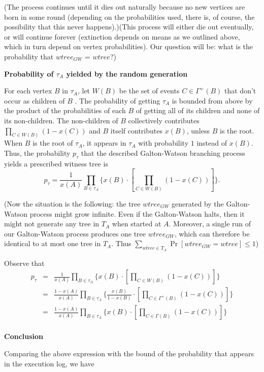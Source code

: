 \documentclass[twoside]{article}
\begin{document}
(The process continues until it dies out naturally because no new vertices are born in some round (depending on the probabilities used, there is, of course, the possibility that this never happens).)(This process will either die out eventually, or will continue forever (extinction depends on means as we outlined above, which in turn depend on vertex probabilities). Our question will be: what is the probability that $wtree_{GW}$ = $wtree$?)

\textbf{Probability of $\tau_A$ yielded by the random generation }

For each vertex $B$ in $\tau_A$, let $W(B)$ be the set of events $C\in \Gamma^+(B)$ that don't occur as children of $B$ . The probability of getting $\tau_{A}$ is bounded from above by the product of the probabilities of each $B$ of getting all of its children and none of its non-children. The non-children of $B$ collectively contributes $\prod_{C\in W(B)}(1-x(C))$ and $B$ itself contributes $x(B)$, unless $B$ is the root. When $B$ is the root of $\tau_{A}$, it appears in $\tau_{A}$ with probability $1$ instead of $x(B)$. Thus, the probability $p_{\tau}$ that the described Galton-Watson branching process yields a prescribed witness tree is
$$p_{\tau}=\frac{1}{x(A)}\prod_{B\in\tau_A}\{x(B)\cdot[\prod_{C\in W(B)}(1-x(C))]\}.$$

(Now the situation is the following: the tree $wtree_{GW}$ generated by the Galton-Watson process might grow infinite. Even if the Galton-Watson halts, then it might not generate any tree in $T_A$ when started at $A$. Moreover, a single run of our Galton-Watson process produces one tree $wtree_{GW}$, which can therefore be identical to at most one tree in $T_A$. Thus $\sum_{wtree\in T_A}\Pr[wtree_{GW}=wtree]\leq 1$)


Observe that 
\begin{eqnarray*}
p_{\tau}&=&\frac{1}{x(A)}\prod_{B\in \tau_A}\{x(B)\cdot[\prod_{C\in W(B)}(1-x(C))]\}\\
&=&\frac{1-x(A)}{x(A)}\prod_{B\in \tau_A}\{\frac{x(B)}{1-x(B)}\cdot[\prod_{C\in \Gamma^+(B)}(1-x(C))]\}\\
&=&\frac{1-x(A)}{x(A)}\prod_{B\in \tau_A}\{x(B)\cdot[\prod_{C\in \Gamma(B)}(1-x(C))]\}\\
\end{eqnarray*}

\textbf{Conclusion}



Comparing the above expression with the bound of the probability that appears in the execution log, we have
\end{document}
